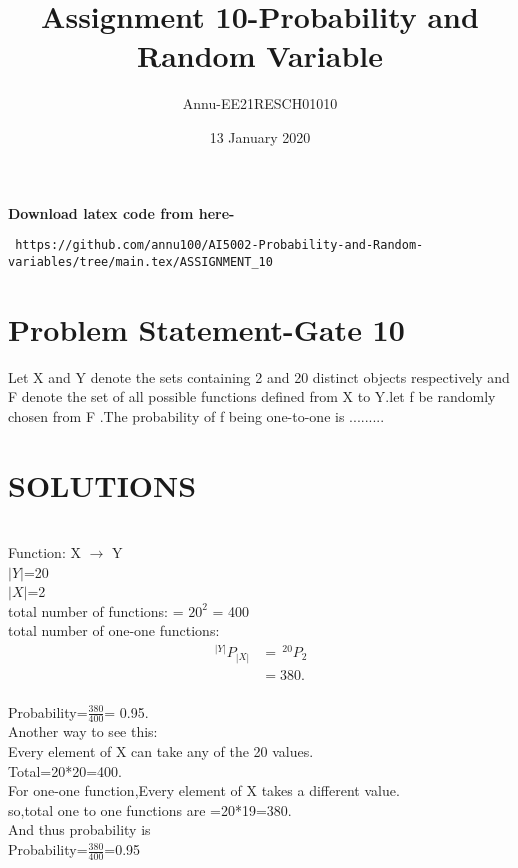 \documentclass[journel,12pt,twocoloums]{IEEEtran}
\title{Assignment 10-Probability and Random Variable}
\author{Annu-EE21RESCH01010}
\date{13 January 2020}
\providecommand{\nPr}[2]{\,^{#1}P_{#2}}
\begin{document}
 \maketitle
\textbf{Download latex code from here-}\\
\begin{lstlisting}
 https://github.com/annu100/AI5002-Probability-and-Random-variables/tree/main.tex/ASSIGNMENT_10
 \end{lstlisting}

 \section{Problem Statement-Gate 10}

Let X and Y denote the sets containing 2 and 20 distinct objects respectively and F denote the set of all possible functions defined from X to Y.let f be randomly chosen from F .The probability of f being one-to-one is .........

\section{SOLUTIONS}


\\
Function: X $ \to $ Y \\
   $|Y|$=20\\
   $|X|$=2\\
total number of functions: = $20^2$ = 400\\
total number of one-one functions: 
\begin{align}
            \nPr{|Y|}{|X|} &=\nPr{20}{2}\\
                           &= 380.\\   
\end{align}

Probability=$\frac{380}{400}$= 0.95.\\

Another way to see this:\\

Every element  of X can take any of the 20 values. \\
Total=20*20=400.\\

For one-one function,Every element of X takes a different value.\\
so,total one to one functions are =20*19=380.\\
And thus probability is\\
Probability=$\frac{380}{400}$=0.95\\
\end{document}
